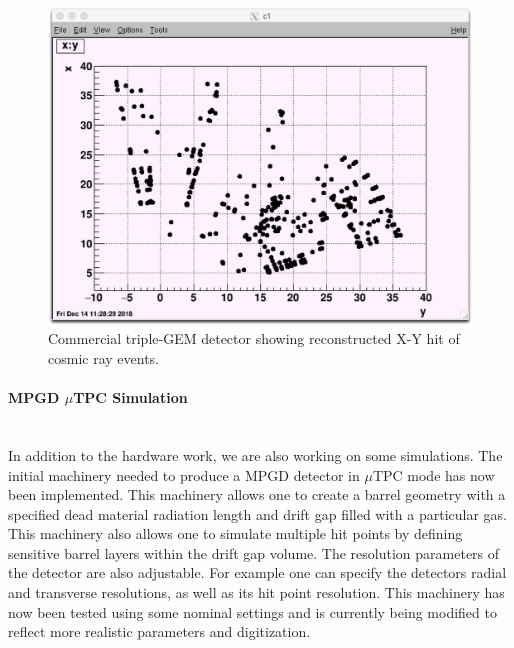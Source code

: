 \begin{figure}
\center
\includegraphics[width=\columnwidth]{TU_plots/Cosmic.png}
\caption{\label{fig:EICGFTcosmic}Commercial triple-GEM detector showing reconstructed X-Y hit of cosmic ray events.}
\end{figure}

\paragraph*{MPGD $\mu$TPC Simulation}\mbox{}\\
In addition to the hardware work, we are also working on some simulations. The initial machinery needed to produce a MPGD detector in $\mu$TPC mode has now been implemented. This machinery allows one to create a barrel geometry with a specified dead material radiation length and drift gap filled with a particular gas. This machinery also allows one to simulate multiple hit points by defining sensitive barrel layers within the drift gap volume. The resolution parameters of the detector are also adjustable. For example one can specify the detectors radial and transverse resolutions, as well as its hit point resolution. This machinery has now been tested using some nominal settings and is currently being modified to reflect more realistic parameters and digitization.